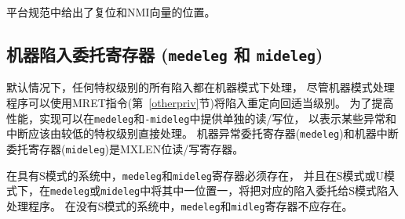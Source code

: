 \iffalse
\begin{commentary}
Reset and NMI vector locations are given in a platform specification.
\end{commentary}
\fi

\begin{commentary}
平台规范中给出了复位和NMI向量的位置。
\end{commentary}

\subsection{机器陷入委托寄存器 ({\tt medeleg} 和 {\tt mideleg})}

\iffalse
By default, all traps at any privilege level are handled in machine
mode, though a machine-mode handler can redirect traps back to the
appropriate level with the MRET instruction (Section~\ref{otherpriv}).
To increase performance, implementations can provide individual
read/write bits within {\tt medeleg} and {\tt mideleg} to indicate
that certain exceptions and interrupts should be processed directly by
a lower privilege level.  The machine exception delegation register
({\tt medeleg}) and machine interrupt delegation register ({\tt
  mideleg}) are MXLEN-bit read/write registers.

In systems with S-mode, the {\tt medeleg} and {\tt mideleg} registers
must exist, and setting a bit in
{\tt medeleg} or {\tt mideleg} will delegate the corresponding trap, when
occurring in S-mode or U-mode, to the S-mode trap handler.
In systems without S-mode, the {\tt medeleg} and {\tt mideleg} registers
should not exist.
\fi

默认情况下，任何特权级别的所有陷入都在机器模式下处理，
尽管机器模式处理程序可以使用MRET指令(第~\ref{otherpriv}节)将陷入重定向回适当级别。
为了提高性能，实现可以在{\tt medeleg}和{\tt-mideleg}中提供单独的读/写位，
以表示某些异常和中断应该由较低的特权级别直接处理。
机器异常委托寄存器({\tt medeleg})和机器中断委托寄存器({\tt mideleg})是MXLEN位读/写寄存器。

在具有S模式的系统中，{\tt medeleg}和{\tt mideleg}寄存器必须存在，
并且在S模式或U模式下，在{\tt medeleg}或{\tt mideleg}中将其中一位置一，将把对应的陷入委托给S模式陷入处理程序。
在没有S模式的系统中，{\tt medeleg}和{\tt midleg}寄存器不应存在。

